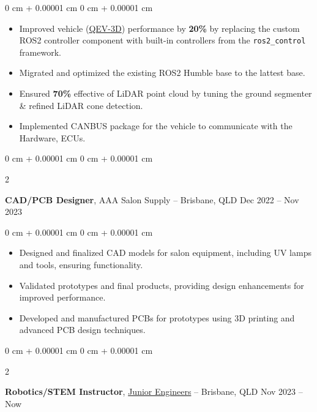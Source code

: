 \documentclass[10pt, letterpaper]{article}
\newenvironment{highlights}{
    \begin{itemize}[
        topsep=0.10 cm,
        parsep=0.10 cm,
        partopsep=0pt,
        itemsep=0pt,
        leftmargin=0 cm + 10pt
    ]
}{
    \end{itemize}
} %
\newenvironment{onecolentry}{
    \begin{adjustwidth}{
        0 cm + 0.00001 cm
    }{
        0 cm + 0.00001 cm
    }
}{
    \end{adjustwidth}
} %
\newenvironment{twocolentry}[2][]{
    \onecolentry
    \def\secondColumn{#2}
    \setcolumnwidth{\fill, 4.5 cm}
    \begin{paracol}{2}
}{
    \switchcolumn \raggedleft \secondColumn
    \end{paracol}
    \endonecolentry
} %
\begin{document}
\vspace{0.10 cm}
\begin{onecolentry}

      \begin{highlights}
            \item Improved vehicle (\href{https://qutmotorsport.com/qev-3d/}{QEV-3D}) performance
            by \textbf{20\%} by replacing the custom ROS2 controller component with
            built-in controllers from the \texttt{ros2\_control} framework.
            \item Migrated and optimized the existing ROS2 Humble base to the lattest base.
            \item Ensured \textbf{70\%} effective of LiDAR point cloud by tuning the ground
            segmenter \& refined LiDAR cone detection.
            \item Implemented CANBUS package for the vehicle to communicate with the Hardware,
            ECUs.

      \end{highlights}
\end{onecolentry}


\vspace{0.4 cm}

\begin{twocolentry}{
            Dec 2022 – Nov 2023
      }
      \textbf{CAD/PCB Designer}, AAA Salon Supply -- Brisbane, QLD\end{twocolentry}

\vspace{0.10 cm}
\begin{onecolentry}
      \begin{highlights}
            \item Designed and finalized CAD models for salon equipment, including UV lamps and tools, 
            ensuring functionality.
            \item Validated prototypes and final products, providing design enhancements for improved 
            performance.
            \item Developed and manufactured PCBs for prototypes using 
            3D printing and advanced PCB design techniques.
      \end{highlights}
\end{onecolentry}

\vspace{0.4 cm}

\begin{twocolentry}{
            Nov 2023 – Now
      }
      \textbf{Robotics/STEM Instructor}, \href{https://www.juniorengineers.com.au/}{Junior Engineers} -- Brisbane, QLD\end{twocolentry}
\end{document}
